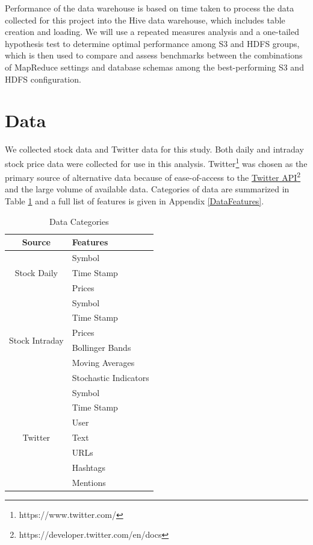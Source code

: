 \documentclass[journal]{IEEEtran}
\begin{document}
Performance of the data warehouse is based on time taken to process the data
collected for this project into the Hive data warehouse,
which includes table creation and loading. 
We will use a repeated measures analysis and a one-tailed hypothesis 
test to determine optimal performance among S3 and HDFS groups, 
which is then used to compare and assess benchmarks between the 
combinations of MapReduce settings and database schemas among the
best-performing S3 and HDFS configuration.

\section{Data}

We collected stock data and Twitter data for this study.
Both daily and intraday stock price data were collected
 for use in this analysis. 
Twitter\footnote{https://www.twitter.com/}
 was chosen as the primary source of alternative data because of
 ease-of-access to the 
 \href{https://developer.twitter.com/en/docs}{Twitter API}\footnote{https://developer.twitter.com/en/docs}
 and the large volume of available data.
Categories of data are summarized in Table \ref{DataCategories} and a full
 list of features is given in Appendix \ref{DataFeatures}.

\begin{table}
    \renewcommand{\arraystretch}{1.3}
    \caption{Data Categories}
    \label{DataCategories}
    \centering
    \begin{tabular}{c l}
        \hline
        \hline
        \textbf{Source}       & \textbf{Features}\\
        \hline
        \multirow{3}{*}{Stock Daily} &  Symbol \\
        &  Time Stamp \\
        &  Prices \\
        \hline
        \multirow{6}{*}{Stock Intraday} &  Symbol \\
        &  Time Stamp \\
        &  Prices \\
        &  Bollinger Bands \\
        &  Moving Averages \\
        &  Stochastic Indicators \\
        \hline
        \multirow{7}{*}{Twitter} &  Symbol \\
        &  Time Stamp \\
        &  User \\
        &  Text \\
        &  URLs \\
        &  Hashtags \\
        &  Mentions \\
        \hline
        \hline
    \end{tabular}
\end{table}
\end{document}

